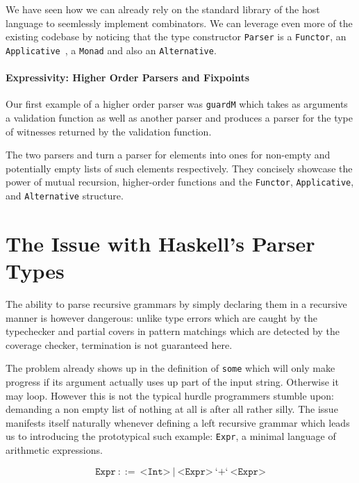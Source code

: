 \documentclass[sigplan,review,anonymous]{acmart}\settopmatter{printfolios=true}
\newcommand{\shgrab}[1]{\medskip\ExecuteMetaData[parser.tex]{#1}}
\newcommand{\hgrab}[1]{\ExecuteMetaData[parser.tex]{#1}}
\newcommand{\parser}[1]{\texttt{#1}}
\newcommand{\type}[1]{\texttt{#1}}
\begin{document}
We have seen how we can already rely on the standard library
of the host language to seemlessly implement combinators.
We can leverage even more of the existing codebase by noticing
that the type constructor \type{Parser} is a \type{Functor},
an \type{Applicative}~, a \type{Monad} and also an \type{Alternative}.


\paragraph{Expressivity: Higher Order Parsers and Fixpoints}

Our first example of a higher order parser was \parser{guardM}
which takes as arguments a validation function as well as another
parser and produces a parser for the type of witnesses returned
by the validation function.

The two parsers  and  turn a parser for elements
into ones for non-empty and potentially empty lists of such elements
respectively. They concisely showcase the power of mutual recursion,
higher-order functions and the \type{Functor}, \type{Applicative},
and \type{Alternative} structure.

\shgrab{some}
\hgrab{many}

\section{The Issue with Haskell's Parser Types}\label{sec:haskellproblem}

The ability to parse recursive grammars by simply declaring
them in a recursive manner is however dangerous: unlike type
errors which are caught by the typechecker and partial covers
in pattern matchings which are detected by the coverage checker,
termination is not guaranteed here.

The problem already shows up in the definition of \parser{some}
which will only make progress if its argument actually uses up
part of the input string. Otherwise it may loop. However this
is not the typical hurdle programmers stumble upon: demanding
a non empty list of nothing at all is after all rather silly.
The issue manifests itself naturally whenever defining a left
recursive grammar which leads us to introducing the prototypical
such example: \type{Expr}, a minimal language of arithmetic
expressions.

\[
\texttt{Expr} ~::=~ \texttt{<Int>} ~|~ \texttt{<Expr>} ~\text{`+`}~ \texttt{<Expr>}
\]
\end{document}
